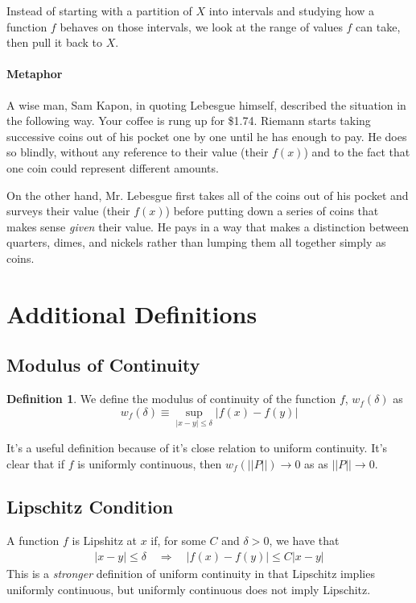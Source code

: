 \documentclass[12pt]{article}
\theoremstyle{plain}
\theoremstyle{definition}
\newtheorem{defn}[thm]{Definition}
\theoremstyle{remark}
\begin{document}
Instead of starting with a partition of $X$ into intervals and studying how a function $f$ behaves on those intervals, we look at the range of values $f$ can take, then pull it back to $X$.

\paragraph{Metaphor}
A wise man, Sam Kapon, in quoting Lebesgue himself, described the situation in the following way. Your coffee is rung up for \$1.74. Riemann starts taking successive coins out of his pocket one by one until he has enough to pay. He does so blindly, without any reference to their value (their $f(x)$) and to the fact that one coin could represent different amounts.

On the other hand, Mr. Lebesgue first takes all of the coins out of his pocket and surveys their value (their $f(x)$) before putting down a series of coins that makes sense \emph{given} their value. He pays in a way that makes a distinction between quarters, dimes, and nickels rather than lumping them all together simply as coins. 



\newpage
\appendix
\section{Additional Definitions}

\subsection{Modulus of Continuity}

\begin{defn} We define the modulus of continuity of the function $f$, $w_f(\delta)$ as 
\begin{equation}
    w_f(\delta) \equiv \sup_{|x-y|\leq\delta} |f(x)-f(y)|
\end{equation}
\end{defn}
It's a useful definition because of it's close relation to uniform continuity.
It's clear that if $f$ is uniformly continuous, then $w_f\left(||P||\right)\rightarrow0$ as as $||P||\rightarrow0$.

\subsection{Lipschitz Condition}

A function $f$ is Lipshitz at $x$ if, for some $C$ and $\delta>0$, we have that 
\begin{align*}
    |x-y|\leq \delta \quad \Rightarrow \quad 
        |f(x) - f(y)|\leq C|x-y|
\end{align*}
This is a \emph{stronger} definition of uniform continuity in that Lipschitz implies uniformly continuous, but uniformly continuous does not imply Lipschitz.
\end{document}
